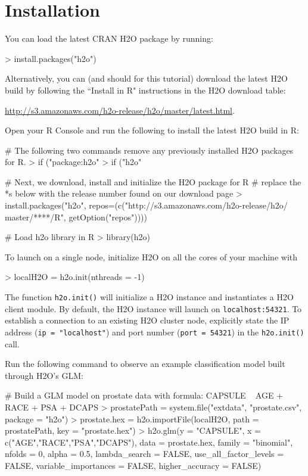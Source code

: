 \documentclass[11pt]{article}
\begin{document}
\section{Installation} 

You can load the latest CRAN H2O package by running:

\begin{spverbatim}
> install.packages("h2o")
\end{spverbatim}
\bigskip
\noindent
Alternatively, you can (and should for this tutorial) download the latest H2O build by following the ``Install in R" instructions in the H2O download table:

\indent \indent \indent \url{http://s3.amazonaws.com/h2o-release/h2o/master/latest.html}.

\noindent
Open your R Console and run the following to install the latest H2O build in R:

\begin{spverbatim}
# The following two commands remove any previously installed H2O packages for R.
> if ("package:h2o" %
> if ("h2o" %

# Next, we download, install and initialize the H2O package for R
# replace the *s below with the release number found on our download page
> install.packages("h2o", repos=(c("http://s3.amazonaws.com/h2o-release/h2o/
master/****/R", getOption("repos"))))

# Load h2o library in R
> library(h2o)

\end{spverbatim}
\noindent
To launch on a single node, initialize H2O on all the cores of your machine with

\begin{spverbatim}
> localH2O = h2o.init(nthreads = -1)

\end{spverbatim}
\noindent
The function \texttt{h2o.init()} will initialize a H2O instance and instantiates a H2O client module. By default, the H2O instance will launch on \texttt{localhost:54321}. To establish a connection to an existing H2O cluster node, explicitly state the IP address (\texttt{ip = "localhost"}) and port number (\texttt{port = 54321}) in the \texttt{h2o.init()} call.

\noindent
Run the following command to observe an example classification model built through H2O's GLM:

\begin{spverbatim}
# Build a GLM model on prostate data with formula: CAPSULE ~ AGE + RACE + PSA + DCAPS
> prostatePath = system.file("extdata", "prostate.csv", package = "h2o")
> prostate.hex = h2o.importFile(localH2O, path = prostatePath, key = "prostate.hex")
> h2o.glm(y = "CAPSULE", x = c("AGE","RACE","PSA","DCAPS"), data = prostate.hex, family = "binomial", nfolds = 0, alpha = 0.5, lambda_search = FALSE,  
use_all_factor_levels = FALSE, variable_importances = FALSE, higher_accuracy = FALSE)
\end{spverbatim}
\end{document}
